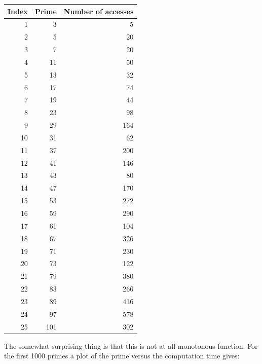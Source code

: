 \documentclass[onecolumn]{article}
\begin{document}
\begin{table}
\begin{center}
\begin{tabular}{rrr}
\hline
Index  & Prime  & Number of accesses \\
\hline
     1 &     3  &          5         \\
     2 &     5  &         20         \\
     3 &     7  &         20         \\
     4 &    11  &         50         \\
     5 &    13  &         32         \\
     6 &    17  &         74         \\
     7 &    19  &         44         \\
     8 &    23  &         98         \\
     9 &    29  &        164         \\
    10 &    31  &         62         \\
    11 &    37  &        200         \\
    12 &    41  &        146         \\
    13 &    43  &         80         \\
    14 &    47  &        170         \\
    15 &    53  &        272         \\
    16 &    59  &        290         \\
    17 &    61  &        104         \\
    18 &    67  &        326         \\
    19 &    71  &        230         \\
    20 &    73  &        122         \\
    21 &    79  &        380         \\
    22 &    83  &        266         \\
    23 &    89  &        416         \\
    24 &    97  &        578         \\
    25 &   101  &        302         \\
\hline
\end{tabular}
\end{center}
\end{table}

The somewhat surprising thing is that this is not at all monotonous function. For the first 1000 primes a plot of the prime versus the computation time gives:
\end{document}
